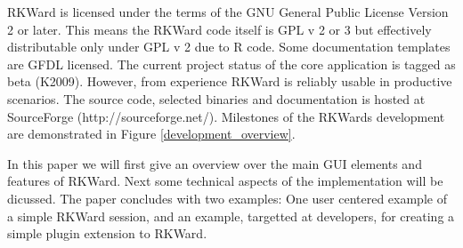 \documentclass[article,shortnames]{jss}
\begin{document}
RKWard is licensed under the terms of the GNU General Public License Version 2
or later. This means the RKWard code itself is GPL v 2 or 3 but effectively
distributable only under GPL v 2 due to R code. Some documentation templates are
GFDL licensed. The current project status of the core application is tagged as
beta (K2009). However, from experience RKWard is reliably usable in productive
scenarios. The source code, selected binaries and documentation is hosted at
SourceForge (http://sourceforge.net/). Milestones of the RKWards development are
demonstrated in Figure \ref{development_overview}.

In this paper we will first give an overview over the main GUI elements and features
of RKWard. Next some technical aspects of the implementation will be dicussed. The paper
concludes with two examples: One user centered example of a simple RKWard session, and
an example, targetted at developers, for creating a simple plugin extension to RKWard.



\end{document}
